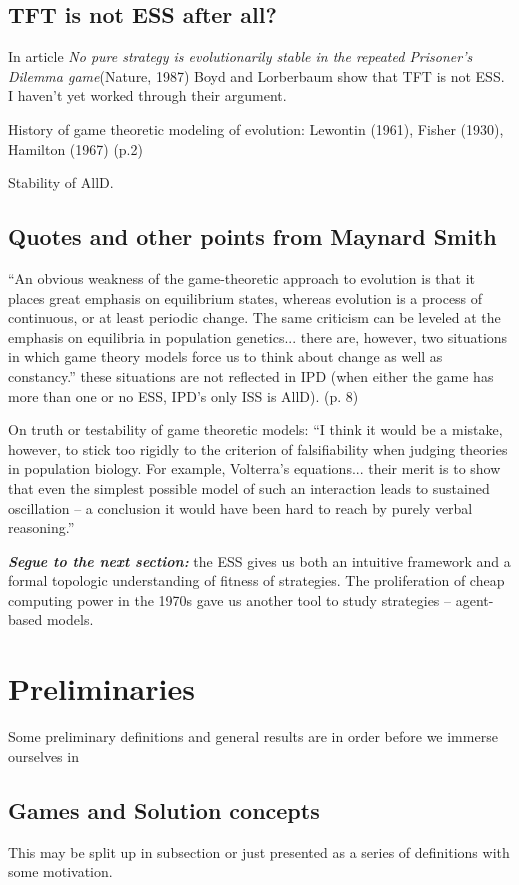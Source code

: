 \section{TFT is not ESS after all?}
In article \textit{No pure strategy is evolutionarily stable in the repeated Prisoner's Dilemma game}(Nature, 1987) Boyd and Lorberbaum show that TFT is not ESS. I haven't yet worked through their argument.


History of game theoretic modeling of evolution: Lewontin (1961), Fisher (1930), Hamilton (1967) (p.2)

Stability of AllD.

\section{Quotes and other points from Maynard Smith}
``An obvious weakness of the game-theoretic approach to evolution is that it places great emphasis on equilibrium states, whereas evolution is a process of continuous, or at least periodic change. The same criticism can be leveled at the emphasis on equilibria in population genetics... there are, however, two situations in which game theory models force us to think about change as well as constancy.'' these situations are not reflected in IPD (when either the game has more than one or no ESS, IPD's only ISS is AllD). (p. 8)

On truth or testability of game theoretic models: ``I think it would be a mistake, however, to stick too rigidly to the criterion of falsifiability when judging theories in population biology. For example, Volterra's equations... their merit is to show that even the simplest possible model of such an interaction leads to sustained oscillation -- a conclusion it would have been hard to reach by purely verbal reasoning.''

\textit{\textbf{Segue to the next section:}} the ESS gives us both an intuitive framework and a formal topologic understanding of fitness of strategies. The proliferation of cheap computing power in the 1970s gave us another tool to study strategies -- agent-based models.

\chapter{Preliminaries}


Some preliminary definitions and general results are in order before we immerse ourselves in 


\section{Games and Solution concepts}
This may be split up in subsection or just presented as a series of definitions with some motivation.

